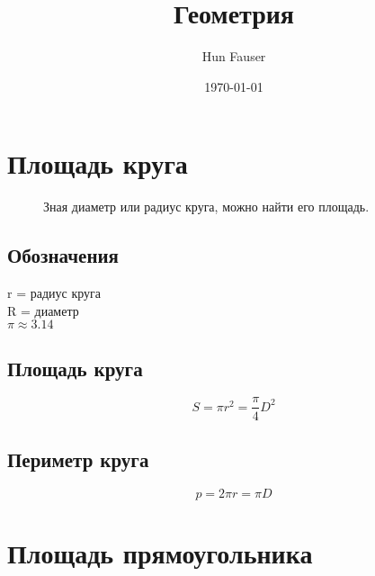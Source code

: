 \documentclass[a4paper,12pt]{article}
\author{Hun Fauser}
\title{Геометрия}
\date{\today}
\begin{document}

\maketitle

\newpage
\section{Площадь круга}

\begin{figure}[h]
\begin{center}
	\caption{Зная диаметр или радиус круга, можно найти его площадь.}
\end{center}
\end{figure}

\subsection{Обозначения}

r = радиус круга \\
R = диаметр \\
$\pi \approx 3.14$

\subsection{Площадь круга}

\[ S = \pi r^2 = \frac{\pi}{4}D^2 \]

\subsection{Периметр круга}

\[ p = 2\pi r = \pi D \]

\newpage
\section{Площадь прямоугольника}
\end{document}
